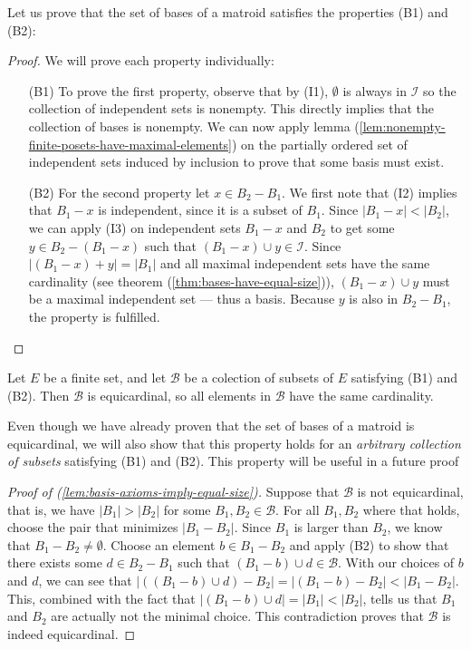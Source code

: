 Let us prove that the set of bases of a matroid satisfies the properties (B1) and (B2):
\begin{proof} We will prove each property individually:
    \begin{enumerate}
        \item[(B1)] 
            To prove the first property, observe that by (I1), $\emptyset$ is always in $\mathcal{I}$ so the collection of independent sets is nonempty. This directly implies that the collection of bases is nonempty. We can now apply lemma (\ref{lem:nonempty-finite-posets-have-maximal-elements}) on the partially ordered set of independent sets induced by inclusion to prove that some basis must exist.
        \item[(B2)]
          For the second property let $x\in B_2 - B_1$. We first note that (I2) implies that $B_1 - x$ is independent, since it is a subset of $B_1$. Since $|B_1-x|<|B_2|$, we can apply (I3) on independent sets $B_1-x$ and $B_2$ to get some $y\in B_2-(B_1-x)$ such that $(B_1-x)\cup y \in\mathcal{I}$. Since $|(B_1-x) + y|=|B_1|$ and all maximal independent sets have the same cardinality (see theorem (\ref{thm:bases-have-equal-size})), $(B_1-x)\cup y$ must be a maximal independent set --- thus a basis. Because $y$ is also in $B_2-B_1$, the property is fulfilled.
    \end{enumerate}
\end{proof} 



\begin{lemma}\label{lem:basis-axioms-imply-equal-size}
    Let $E$ be a finite set, and let $\mathcal{B}$ be a colection of subsets of $E$ satisfying (B1) and (B2). Then $\mathcal{B}$ is equicardinal, so all elements in $\mathcal{B}$ have the same cardinality.
\end{lemma}

Even though we have already proven that the set of bases of a matroid is equicardinal, we will also show that this property holds for an \textit{arbitrary collection of subsets} satisfying (B1) and (B2). This property will be useful in a future proof


\begin{proof}[Proof of (\ref{lem:basis-axioms-imply-equal-size})]
    Suppose that $\mathcal{B}$ is not equicardinal, that is, we have $|B_1|>|B_2|$ for some $B_1,B_2\in\mathcal{B}$. For all $B_1,B_2$ where that holds, choose the pair that minimizes $|B_1-B_2|$. Since $B_1$ is larger than $B _2$, we know that $B _1 - B _2 \neq \emptyset$. Choose an element $b\in B_1-B_2$ and apply (B2) to show that there exists some $d\in B_2-B_1$ such that $(B_1-b)\cup d \in\mathcal{B}$. With our choices of $b$ and $d$, we can see that $|((B_1-b)\cup d)-B_2|=|(B_1-b)-B_2|<|B_1-B_2|$. This, combined with the fact that $|(B_1-b)\cup d|=|B_1|<|B_2|$, tells us that $B_1$ and $B_2$ are actually not the minimal choice. This contradiction proves that $\mathcal{B}$ is indeed equicardinal.
\end{proof}

